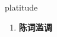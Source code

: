 
\begin{frame}
{\huge platitude}
\begin{center}
\begin{enumerate}\Large
  \item \textbf{陈词滥调}
\end{enumerate}
\end{center}
\end{frame}
